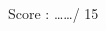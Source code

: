 \documentclass[a4paper,11pt,landscape,exos]{nsi} %
\begin{document}
\begin{multicols}{2}
\vfill\null

Score : \ldots\ldots / 15
\end{multicols}

\newpage

\begin{multicols}{2}
\maketitle

\begin{enumerate}[]


\end{enumerate}
\end{multicols}
\end{document}
